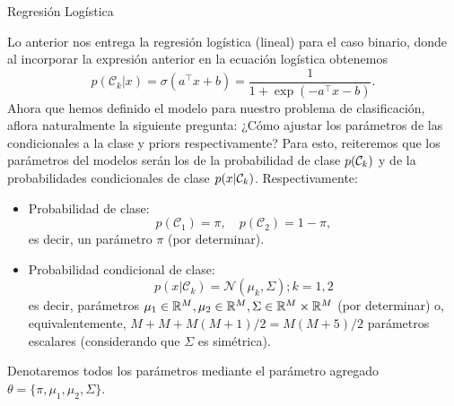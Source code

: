 \documentclass[9pt]{beamer}
\begin{document}
\begin{frame}{Regresión Logística}

Lo anterior nos entrega la regresión logística (lineal) para el  caso binario, donde al incorporar la expresión anterior en la ecuación logística obtenemos
\begin{equation*}
  p(\mathcal{C}_k|x) = \sigma(a^\top x+b) = \frac{1}{1 + \exp{\left(-a^\top x-b\right)}}.
\end{equation*} \pause
Ahora que hemos definido el modelo para nuestro problema de clasificación, aflora naturalmente la siguiente pregunta: ¿Cómo ajustar los parámetros de las condicionales a la clase y priors respectivamente? Para esto, reiteremos que los parámetros del modelos serán los de la probabilidad de clase $p({\mathcal C}_k)$ y de la probabilidades condicionales de clase $p(x|{\mathcal C}_k)$. Respectivamente: \pause

\begin{itemize}
  \item Probabilidad de clase:
  \begin{equation*}
    p(\mathcal{C}_1)=\pi,\quad  p(\mathcal{C}_2)=1-\pi,
   \end{equation*}  es decir,  un parámetro $\pi$ (por determinar). \pause
  \item Probabilidad condicional de clase:
  \begin{equation*}
    p(x|\mathcal{C}_k) = \mathcal{N}(\mu_k,  \Sigma); k=1,2
  \end{equation*} 
  es decir, parámetros $ \mu_1\in\mathbb{R}^M,\mu_2\in\mathbb{R}^M,\Sigma\in\mathbb{R}^M\times\mathbb{R}^M$ (por determinar) o, equivalentemente, $M + M + M(M+1)/2=M(M+5)/2$ parámetros escalares (considerando que $\Sigma$ es simétrica). 
\end{itemize}
\pause
Denotaremos todos los parámetros mediante el parámetro agregado $\theta =\{\pi,\mu_1,\mu_2,\Sigma \}$.
\end{frame}
\end{document}
